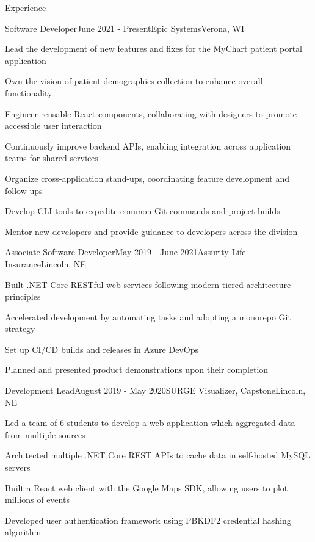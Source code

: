 \documentclass[
	10pt, %
]{article} %
\begin{document}
\begin{rSection}{Experience}

	\begin{rSubsection}{Software Developer}{June 2021 - Present}{Epic Systems}{Verona, WI}
		\item Lead the development of new features and fixes for the MyChart patient portal application
		\item Own the vision of patient demographics collection to enhance overall functionality
		\item Engineer reusable React components, collaborating with designers to promote accessible user interaction
		\item Continuously improve backend APIs, enabling integration across application teams for shared services
		\item Organize cross-application stand-ups, coordinating feature development and follow-ups
		\item Develop CLI tools to expedite common Git commands and project builds
		\item Mentor new developers and provide guidance to developers across the division
	\end{rSubsection}

	\begin{rSubsection}{Associate Software Developer}{May 2019 - June 2021}{Assurity Life Insurance}{Lincoln, NE}
		\item Built .NET Core RESTful web services following modern tiered-architecture principles
		\item Accelerated development by automating tasks and adopting a monorepo Git strategy
		\item Set up CI/CD builds and releases in Azure DevOps
		\item Planned and presented product demonstrations upon their completion
	\end{rSubsection}

	\begin{rSubsection}{Development Lead}{August 2019 - May 2020}{SURGE Visualizer, Capstone}{Lincoln, NE}
		\item Led a team of 6 students to develop a web application which aggregated data from multiple sources
		\item Architected multiple .NET Core REST APIs to cache data in self-hosted MySQL servers
		\item Built a React web client with the Google Maps SDK, allowing users to plot millions of events
		\item Developed user authentication framework using PBKDF2 credential hashing algorithm
	\end{rSubsection}


\end{rSection}
\end{document}
